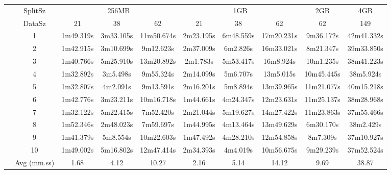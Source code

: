 \begin{tabularx}{\linewidth}{*{10}{c|}}
\cline{2-10}
& SplitSz 
& \multicolumn{3}{c|}{256MB} & \multicolumn{3}{c|}{1GB}  & \multicolumn{1}{c|}{2GB} & \multicolumn{1}{c|}{4GB} \\
\cline{2-10}
& DataSz 
& 21 & 38 & 62 & 21 & 38 & 62 & 62 & 149 \\
\cline{2-10}
& 1
& 1m49.319s & 3m33.105s & 11m50.674s & 2m23.195s & 6m48.559s & 17m20.231s & 9m36.172s & 42m41.332s \\
\cline{2-10}
& 2
& 1m42.915s & 3m10.699s & 9m12.623s & 2m37.009s & 6m2.826s & 16m33.021s & 8m21.347s & 39m33.850s \\
\cline{2-10}
& 3
& 1m40.766s & 5m25.910s & 13m20.892s & 2m1.783s & 5m53.417s & 16m8.924s & 10m1.235s & 38m41.223s \\
\cline{2-10}
& 4
& 1m32.892s & 3m5.498s & 9m55.324s & 2m14.099s & 5m6.707s & 13m5.015s & 10m45.445s & 38m5.924s \\
\cline{2-10}
& 5
& 1m32.807s & 4m2.091s & 9m13.591s & 2m16.201s & 5m8.894s & 13m39.965s & 11m21.077s & 40m15.218s \\
\cline{2-10}
& 6
& 1m42.776s & 3m23.211s & 10m16.718s & 1m44.661s & 4m24.347s & 12m23.631s & 11m25.137s & 38m28.968s \\
\cline{2-10}
& 7
& 1m32.122s & 5m22.415s & 7m52.420s & 2m21.044s & 5m19.627s & 14m27.422s & 11m23.863s & 37m55.466s \\
\cline{2-10}
& 8
& 1m52.346s & 2m48.023s & 7m59.697s & 1m44.995s & 4m13.464s & 13m49.629s & 6m30.170s & 38m2.429s \\
\cline{2-10}
& 9
& 1m41.379s & 5m8.554s & 10m22.603s & 1m47.492s & 4m28.210s & 12m54.858s & 8m7.309s & 37m10.927s \\
\cline{2-10}
& 10
& 1m49.002s & 5m16.802s & 12m47.414s & 2m34.393s & 4m4.019s & 10m56.675s & 9m29.239s & 37m52.524s \\
\cline{2-10}
& Avg (mm.ss)
& 1.68 & 4.12 & 10.27 & 2.16 & 5.14 & 14.12 & 9.69 & 38.87 \\
\cline{2-10}
\end{tabularx}
